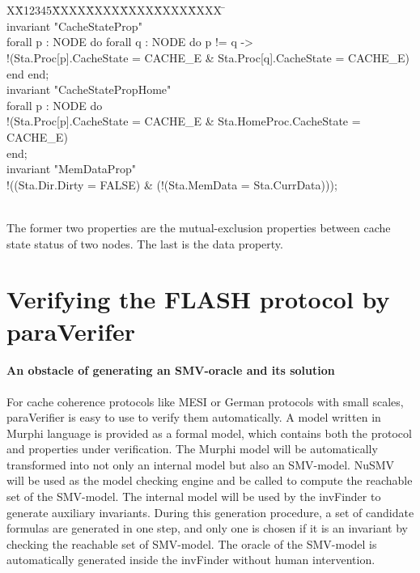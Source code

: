 \documentclass{llncs}
\newlength{\fminilength}
\newenvironment{fmini}[1][\linewidth]
  {\setlength{\fminilength}{#1\fboxsep-2\fboxrule}%
   \vspace{2ex}\noindent\begin{lrbox}{\fminibox}\begin{minipage}{\fminilength}%
   \mbox{ }\hfill\vspace{-2.5ex}}%
  {\end{minipage}\end{lrbox}\vspace{1ex}\hspace{0ex}%
   \framebox{\usebox{\fminibox}}}
\newenvironment{specification}
{\noindent\scriptsize
\tt\begin{fmini}\begin{tabbing}X\=X12345\=XXXX\=XXXX\=XXXX\=XXXX\=XXXX
\=\+\kill} {\end{tabbing}\normalfont\end{fmini}}
\newcommand{\bedt}[1]{{\color{black}#1}}
\begin{document}
\begin{specification}\\
invariant "CacheStateProp"\\
  forall p : NODE do forall q : NODE do     p != q ->\\
    !(Sta.Proc[p].CacheState = CACHE\_E \& Sta.Proc[q].CacheState = CACHE\_E)\\
  end end;\\

invariant "CacheStatePropHome"\\
  forall p : NODE do\\
    !(Sta.Proc[p].CacheState = CACHE\_E \& Sta.HomeProc.CacheState = CACHE\_E)\\
  end;\\

invariant "MemDataProp"\\
  !((Sta.Dir.Dirty = FALSE) \& (!(Sta.MemData = Sta.CurrData)));\\
\end{specification}\\

The former two properties are the mutual-exclusion properties between  cache state status of two nodes. The last is the  data property.

\section{Verifying the FLASH protocol by {\sf paraVerifer} \label{sec:experiments}}
\paragraph{An obstacle of generating an SMV-oracle and its solution}
For cache coherence protocols like MESI or German protocols with small scales,   {\sf paraVerifier}  is easy to use to verify them automatically. \bedt{A model written in Murphi language} is provided as a formal model, which contains both the protocol and properties under verification. The Murphi model will be automatically transformed into not only an internal model but also an SMV-model. NuSMV will \bedt{be used as the model checking engine} and be called to compute the reachable set of the SMV-model. The internal model will be used by the {\sf invFinder} to generate auxiliary invariants. During this generation procedure, a set of candidate  formulas are generated in one step, and only one is chosen  if it is an invariant by checking the reachable set of   SMV-model. The oracle of the SMV-model is automatically generated inside the {\sf invFinder} without human intervention.
\end{document}
